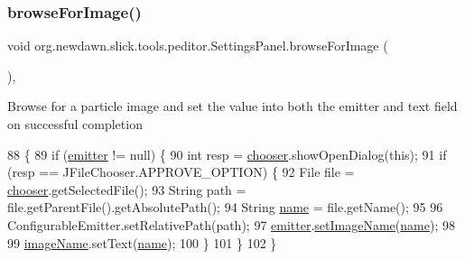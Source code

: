 \subsubsection{\texorpdfstring{browse\+For\+Image()}{browseForImage()}}
{\footnotesize\ttfamily void org.\+newdawn.\+slick.\+tools.\+peditor.\+Settings\+Panel.\+browse\+For\+Image (\begin{DoxyParamCaption}{ }\end{DoxyParamCaption})\hspace{0.3cm}{\ttfamily [inline]}, {\ttfamily [private]}}

Browse for a particle image and set the value into both the emitter and text field on successful completion 
\begin{DoxyCode}
88                                   \{
89         \textcolor{keywordflow}{if} (\mbox{\hyperlink{classorg_1_1newdawn_1_1slick_1_1tools_1_1peditor_1_1_control_panel_aaa170169fa574cb6b271f782afcd2517}{emitter}} != null) \{
90             \textcolor{keywordtype}{int} resp = \mbox{\hyperlink{classorg_1_1newdawn_1_1slick_1_1tools_1_1peditor_1_1_settings_panel_a33ff97f1c03365d359210ba6c1809726}{chooser}}.showOpenDialog(\textcolor{keyword}{this});
91             \textcolor{keywordflow}{if} (resp == JFileChooser.APPROVE\_OPTION) \{
92                 File file = \mbox{\hyperlink{classorg_1_1newdawn_1_1slick_1_1tools_1_1peditor_1_1_settings_panel_a33ff97f1c03365d359210ba6c1809726}{chooser}}.getSelectedFile();
93                 String path = file.getParentFile().getAbsolutePath();
94                 String \mbox{\hyperlink{classorg_1_1newdawn_1_1slick_1_1tools_1_1peditor_1_1_settings_panel_a89dd9ef29714429f196e1009b3a230e9}{name}} = file.getName();
95                 
96                 ConfigurableEmitter.setRelativePath(path);
97                 \mbox{\hyperlink{classorg_1_1newdawn_1_1slick_1_1tools_1_1peditor_1_1_control_panel_aaa170169fa574cb6b271f782afcd2517}{emitter}}.\mbox{\hyperlink{classorg_1_1newdawn_1_1slick_1_1particles_1_1_configurable_emitter_aa4bbab57939ae64a1a3fd83704df7065}{setImageName}}(\mbox{\hyperlink{classorg_1_1newdawn_1_1slick_1_1tools_1_1peditor_1_1_settings_panel_a89dd9ef29714429f196e1009b3a230e9}{name}});
98                 
99                 \mbox{\hyperlink{classorg_1_1newdawn_1_1slick_1_1tools_1_1peditor_1_1_settings_panel_a4890547c09df436528a31f392cec73dd}{imageName}}.setText(\mbox{\hyperlink{classorg_1_1newdawn_1_1slick_1_1tools_1_1peditor_1_1_settings_panel_a89dd9ef29714429f196e1009b3a230e9}{name}});
100             \}
101         \}
102     \}
\end{DoxyCode}
\mbox{\label{classorg_1_1newdawn_1_1slick_1_1tools_1_1peditor_1_1_settings_panel_ab5e3da40629484295a5dcd9e0fc1c396}} 
